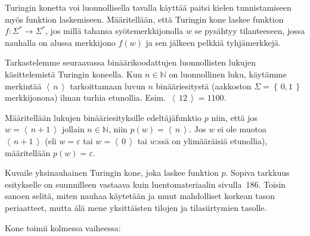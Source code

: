 \documentclass[12pt,a4paper]{article}
\newcommand{\set}[1]{\left\{\,#1\,\right\}}
\newcommand{\N}{\mathbb{N}}
\newcommand{\code}[1]{\left\langle\,#1\,\right\rangle}
\begin{document}
\pagebreak
{}
Turingin konetta voi luonnollisella tavalla käyttää paitsi kielen
tunnistamiseen myös funktion laskemiseen.
Määritellään, että Turingin kone laskee funktion
$f\colon\Sigma^\ast\rightarrow\Sigma^\ast$, jos millä
tahansa syötemerkkijonolla $w$ se pysähtyy tilanteeseen, jossa
nauhalla on alussa merkkijono $f(w)$ ja sen jälkeen pelkkiä
tyhjämerkkejä.

Tarkastelemme seuraavassa binäärikoodattujen luonnollisten lukujen
käsittelemistä Turingin koneella.
Kun $n\in\N$ on luonnollinen luku, käytämme merkintää
$\code{n}$ tarkoittamaan luvun $n$ binääriesitystä
(aakkoston $\Sigma=\set{0,1}$ merkkijonona) ilman
turhia etunollia.
Esim.\ $\code{12}=1100$.

Määritellään lukujen binääriesityksille edeltäjäfunktio
$p$ niin, että jos $w=\code{n+1}$ jollain $n\in\N$, niin
$p(w)=\code{n}$.
Jos $w$ ei ole muotoa $\code{n+1}$ (eli $w=\varepsilon$
tai $w=\code{0}$ tai $w$:ssä
on ylimääräisiä etunollia), määritellään
$p(w)=\varepsilon$.

Kuvaile yksinauhainen Turingin kone, joka laskee funktion $p$.
Sopiva tarkkuus esitykselle on suunnilleen vastaava kuin
luentomateriaalin sivulla~186.
Toisin sanoen selitä, miten nauhaa käytetään ja muut mahdolliset
korkean tason periaatteet, mutta älä mene yksittäisten tilojen ja
tilasiirtymien tasolle.\\
\newline






\medskip
Kone toimii kolmessa vaiheessa:
\end{document}
